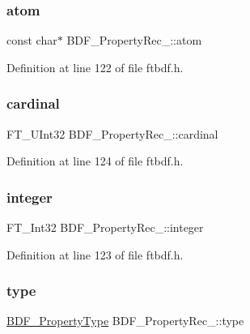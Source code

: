 \subsubsection{\texorpdfstring{atom}{atom}}
{\footnotesize\ttfamily const char$\ast$ B\+D\+F\+\_\+\+Property\+Rec\+\_\+\+::atom}



Definition at line 122 of file ftbdf.\+h.

\mbox{\label{struct_b_d_f___property_rec___adaba2e4ce8da90a5ea59080a0521d332}} 
\subsubsection{\texorpdfstring{cardinal}{cardinal}}
{\footnotesize\ttfamily F\+T\+\_\+\+U\+Int32 B\+D\+F\+\_\+\+Property\+Rec\+\_\+\+::cardinal}



Definition at line 124 of file ftbdf.\+h.

\mbox{\label{struct_b_d_f___property_rec___a71243b414ad203fd7d6d2468c39bbd79}} 
\subsubsection{\texorpdfstring{integer}{integer}}
{\footnotesize\ttfamily F\+T\+\_\+\+Int32 B\+D\+F\+\_\+\+Property\+Rec\+\_\+\+::integer}



Definition at line 123 of file ftbdf.\+h.

\mbox{\label{struct_b_d_f___property_rec___a88c19ee6f16bd1b36127f5f7d44a4e39}} 
\subsubsection{\texorpdfstring{type}{type}}
{\footnotesize\ttfamily \mbox{\hyperlink{ftbdf_8h_a3e95a243aac87978075ca8b42635a0b2}{B\+D\+F\+\_\+\+Property\+Type}} B\+D\+F\+\_\+\+Property\+Rec\+\_\+\+::type}



